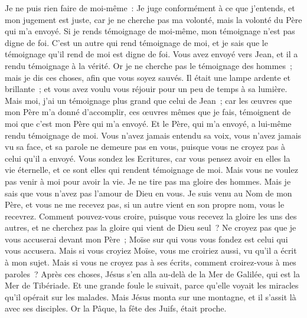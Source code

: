 \begin{multicols}{2}
Je ne puis rien faire de moi-même~: Je juge conformément à ce que j'entends, et mon jugement est juste, car je ne cherche pas ma volonté, mais la volonté du Père qui m'a envoyé.
Si je rends témoignage de moi-même, mon témoignage n'est pas digne de foi.
C'est un autre qui rend témoignage de moi, et je sais que le témoignage qu'il rend de moi est digne de foi.
Vous avez envoyé vers Jean, et il a rendu témoignage à la vérité.
Or je ne cherche pas le témoignage des hommes~; mais je dis ces choses, afin que vous soyez sauvés.
Il était une lampe ardente et brillante~; et vous avez voulu vous réjouir pour un peu de temps à sa lumière.
Mais moi, j'ai un témoignage plus grand que celui de Jean~; car les œuvres que mon Père m'a donné d'accomplir, ces œuvres mêmes que je fais, témoignent de moi que c'est mon Père qui m'a envoyé.
Et le Père, qui m'a envoyé, a lui-même rendu témoignage de moi. Vous n'avez jamais entendu sa voix, vous n'avez jamais vu sa face,
et sa parole ne demeure pas en vous, puisque vous ne croyez pas à celui qu'il a envoyé.
Vous sondez les Ecritures, car vous pensez avoir en elles la vie éternelle, et ce sont elles qui rendent témoignage de moi.
Mais vous ne voulez pas venir à moi pour avoir la vie.
Je ne tire pas ma gloire des hommes.
Mais je sais que vous n'avez pas l'amour de Dieu en vous.
Je suis venu au Nom de mon Père, et vous ne me recevez pas, si un autre vient en son propre nom, vous le recevrez.
Comment pouvez-vous croire, puisque vous recevez la gloire les uns des autres, et ne cherchez pas la gloire qui vient de Dieu seul~?
Ne croyez pas que je vous accuserai devant mon Père~; Moïse sur qui vous vous fondez est celui qui vous accusera.
Mais si vous croyiez Moïse, vous me croiriez aussi, vu qu'il a écrit à mon sujet.
Mais si vous ne croyez pas à ses écrits, comment croirez-vous à mes paroles~?
\VerseOne{}Après ces choses, Jésus s'en alla au-delà de la Mer de Galilée, qui est la Mer de Tibériade.
Et une grande foule le suivait, parce qu'elle voyait les miracles qu'il opérait sur les malades.
Mais Jésus monta sur une montagne, et il s'assit là avec ses disciples.
Or la Pâque, la fête des Juifs, était proche.

\end{multicols}
